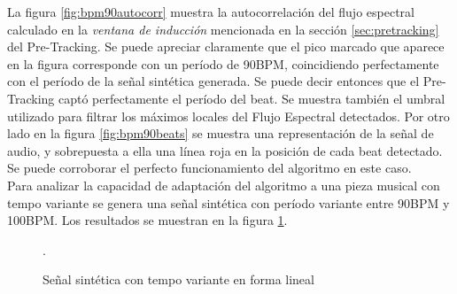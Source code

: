 \documentclass[12pt,a4paper,titlepage]{report}
\begin{document}
La figura \ref{fig:bpm90autocorr} muestra la autocorrelación del flujo espectral calculado en la \emph{ventana de inducción} mencionada en la sección \ref{sec:pretracking} del Pre-Tracking. Se puede apreciar claramente que el pico marcado que aparece en la figura corresponde con un período de 90BPM, coincidiendo perfectamente con el período de la señal sintética generada. Se puede decir entonces que el Pre-Tracking captó perfectamente el período del beat. Se muestra también el umbral utilizado para filtrar los máximos locales del Flujo Espectral detectados. Por otro lado en la figura \ref{fig:bpm90beats} se muestra una representación de la señal de audio, y sobrepuesta a ella una línea roja en la posición de cada beat detectado. Se puede corroborar el perfecto funcionamiento del algoritmo en este caso.\\

Para analizar la capacidad de adaptación del algoritmo a una pieza musical con tempo variante se genera una señal sintética con período variante entre 90BPM y 100BPM. Los resultados se muestran en la figura \ref{fig:tempovariante}.

\begin{figure} [h!]
\centering
  \caption{Señal sintética con tempo variante en forma lineal}
  \label{fig:tempovariante}.
\end{figure}
\end{document}
